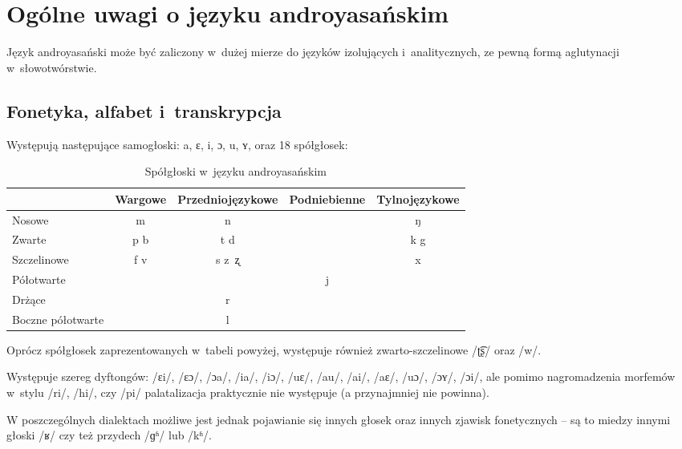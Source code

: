 \section[Ogólne uwagi]{Ogólne uwagi o języku androyasańskim}

\begin{spacing}{1.1}
Język androyasański może być zaliczony w~dużej mierze do języków 
izolujących i~analitycznych, ze pewną formą aglutynacji w~słowotwórstwie.

\subsection{Fonetyka, alfabet i~transkrypcja}

Występują następujące samogłoski: a, ɛ, i, ɔ, u, ʏ, oraz 18 spółgłosek:

\begin{table}[ht]
\centering
\caption{Spółgłoski w~języku androyasańskim}
\begin{tabular}{lcccc}\toprule
                  & Wargowe & Przedniojęzykowe & Podniebienne & Tylnojęzykowe \\\midrule
Nosowe            & m       & n                &              & ŋ             \\\midrule
Zwarte            & p b     & t d              &              & k g           \\\midrule
Szczelinowe       & f v     & s z~ʐ            &              & x             \\\midrule
Półotwarte        &         &                  & j            &               \\\midrule
Drżące            &         & r                &              &               \\\midrule
Boczne półotwarte &         & l                &              &               \\\bottomrule
\end{tabular}
\label{tab:consonants}
\end{table}

Oprócz spółgłosek zaprezentowanych w~tabeli powyżej, występuje 
również zwarto-szczelinowe /ʈ͡ʂ/ oraz /w/.

Występuje szereg dyftongów: /ɛi/, /ɛɔ/, /ɔa/, /ia/, /iɔ/, /uɛ/, /au/, /ai/, 
/aɛ/, /uɔ/, /ɔʏ/, /ɔi/, ale pomimo nagromadzenia morfemów w~stylu /ri/, /hi/, 
czy /pi/ palatalizacja praktycznie nie występuje (a przynajmniej nie powinna).

W poszczególnych dialektach możliwe jest jednak pojawianie się innych głosek
oraz innych zjawisk fonetycznych -- są to miedzy innymi głoski /ʁ/ czy też
przydech /ɡʱ/ lub /kʱ/.


\end{spacing}
